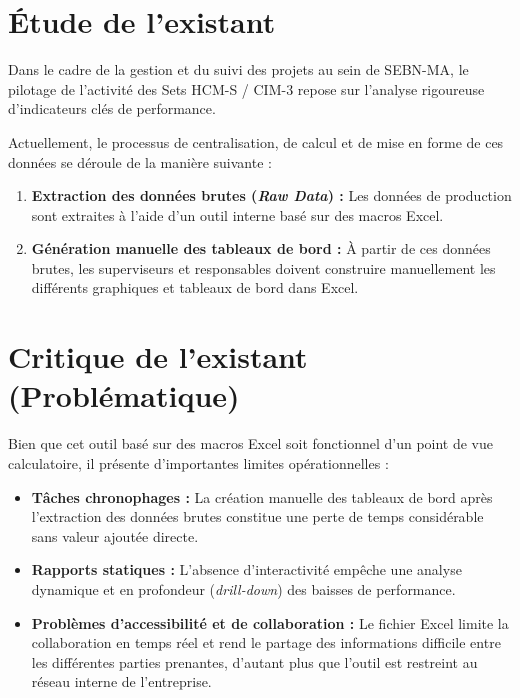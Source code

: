 \section{Étude de l'existant}
Dans le cadre de la gestion et du suivi des projets au sein de SEBN-MA, le pilotage de l'activité des Sets HCM-S / CIM-3 repose sur l'analyse rigoureuse d'indicateurs clés de performance. 

Actuellement, le processus de centralisation, de calcul et de mise en forme de ces données se déroule de la manière suivante :
\begin{enumerate}
    \item \textbf{Extraction des données brutes (\textit{Raw Data}) :} Les données de production sont extraites à l'aide d'un outil interne basé sur des macros Excel.
    \item \textbf{Génération manuelle des tableaux de bord :} À partir de ces données brutes, les superviseurs et responsables doivent construire manuellement les différents graphiques et tableaux de bord dans Excel.
\end{enumerate}

\section{Critique de l'existant (Problématique)}
Bien que cet outil basé sur des macros Excel soit fonctionnel d'un point de vue calculatoire, il présente d'importantes limites opérationnelles :
\begin{itemize}
    \item \textbf{Tâches chronophages :} La création manuelle des tableaux de bord après l'extraction des données brutes constitue une perte de temps considérable sans valeur ajoutée directe.
    \item \textbf{Rapports statiques :} L'absence d'interactivité empêche une analyse dynamique et en profondeur (\textit{drill-down}) des baisses de performance.
    \item \textbf{Problèmes d'accessibilité et de collaboration :} Le fichier Excel limite la collaboration en temps réel et rend le partage des informations difficile entre les différentes parties prenantes, d'autant plus que l'outil est restreint au réseau interne de l'entreprise.
\end{itemize}

